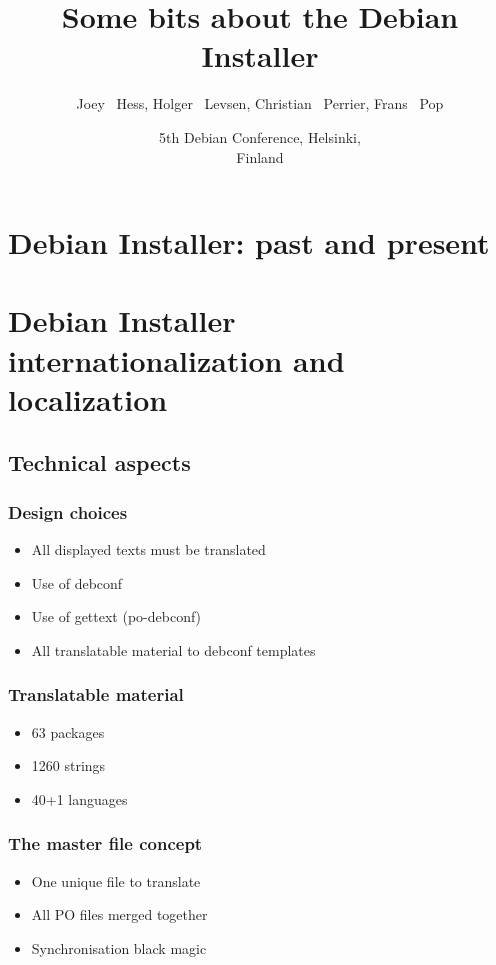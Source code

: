\documentclass{beamer}
\title[Some bits about the Debian Installer] %
{Some bits about the Debian Installer}
\author[joeyh, h0lger, bubulle, fjp] %
{Joey ~Hess, Holger ~Levsen, Christian ~Perrier, Frans ~Pop}
\date[Debconf 5] %
{5th Debian Conference, Helsinki,\\ Finland}
\begin{document}
\begin{frame}
  \titlepage
\end{frame}


\section{Debian Installer: past and present}

\begin{frame}
  \frametitle{}
\end{frame}


\section{Debian Installer internationalization and localization}

\subsection{Technical aspects}

\begin{frame}
  \frametitle{Design choices}
	\begin{itemize}
	\item
		All displayed texts must be translated
	\item
		Use of debconf
	\item
		Use of gettext (po-debconf)
	\item
		All translatable material to debconf templates
	\end{itemize}
\end{frame}

\begin{frame}
  \frametitle{Translatable material}
	\begin{itemize}
	\item
		63 packages 
	\item
		1260 strings
	\item
		40+1 languages
	\end{itemize}
\end{frame}

\begin{frame}
  \frametitle{The master file concept}
	\begin{itemize}
	\item
		One unique file to translate
	\item
		All PO files merged together
	\item
		Synchronisation black magic
	\end{itemize}
\end{frame}
\end{document}
